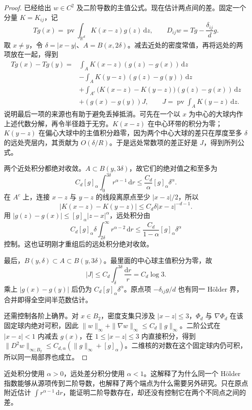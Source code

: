 \begin{proof}
已经给出 \(w\in C^2\) 及二阶导数的主值公式。现在估计两点间的差。固定一个分量 \(K=K_{ij}\)，记
\[
 Tg(x)=\operatorname{pv}\int_{\mathbb R^d}K(x-z)g(z)\,\mathrm dz,
 \qquad D_{ij}w=Tg-\frac{\delta_{ij}}d g.
\]
取 \(x\ne y\)，令 \(\delta=|x-y|\)、\(A=B(x,2\delta)\)。减去近处的密度常值，再将远处的两项放在一起，得到
\begin{align*}
 Tg(x)-Tg(y)={}&
 \int_AK(x-z)(g(z)-g(x))\,\mathrm dz\\
 &-\int_AK(y-z)(g(z)-g(y))\,\mathrm dz\\
 &+\int_{A^c}\bigl(K(x-z)-K(y-z)\bigr)(g(z)-g(x))\,\mathrm dz\\
 &+(g(x)-g(y))J,\qquad
 J=\operatorname{pv}\int_AK(y-z)\,\mathrm dz.
\end{align*}
说明最后一项的来源也有助于避免丢掉抵消。可先在一个以 \(x\) 为中心的大球内作上述代数分解，再令半径趋于无穷。\(K(x-z)\) 在中心环带的积分为零；\(K(y-z)\) 在偏心大球中的主值积分趋零，因为两个中心大球的差只在厚度至多 \(\delta\) 的远处壳层内，其贡献为 \(O(\delta/R)\)。于是远处常数项的差正好是 \(J\)，得到所列公式。

两个近处积分都绝对收敛。\(A\subset B(y,3\delta)\)，故它们的绝对值之和至多为
\[
 C_d[g]_\alpha\int_0^{3\delta}r^{\alpha-1}\,\mathrm dr
 \le\frac{C_d}{\alpha}[g]_\alpha\delta^\alpha.
\]
在 \(A^c\) 上，连接 \(x-z\) 与 \(y-z\) 的线段离原点至少 \(|x-z|/2\)，所以
\[
 |K(x-z)-K(y-z)|\le C_d\delta|x-z|^{-d-1}.
\]
用 \(|g(z)-g(x)|\le[g]_\alpha|z-x|^\alpha\)，远处积分由
\[
 C_d[g]_\alpha\delta\int_{2\delta}^{\infty}r^{\alpha-2}\,\mathrm dr
 \le\frac{C_d}{1-\alpha}[g]_\alpha\delta^\alpha
\]
控制。这也证明刚才重组后的远处积分绝对收敛。

最后，\(B(y,\delta)\subset A\subset B(y,3\delta)\)。最里面的中心球主值积分为零，故
\[
 |J|\le C_d\int_\delta^{3\delta}\frac{\mathrm dr}{r}=C_d\log3.
\]
乘上 \(|g(x)-g(y)|\) 后仍为 \(C_d[g]_\alpha\delta^\alpha\)。原点项 \(-\delta_{ij}g/d\) 也有同一 Hölder 界，合并即得全空间半范数估计。

还需控制各阶上确界。对 \(x\in B_2\)，密度支集只涉及 \(|x-z|\le3\)，\(\Phi_d\) 与 \(\nabla\Phi_d\) 在该固定球内绝对可积，因此 \(\|w\|_\infty+\|\nabla w\|_\infty\le C_d\|g\|_\infty\)。二阶公式在 \(|x-z|<1\) 内减去 \(g(x)\)，在 \(1\le|x-z|\le3\) 内直接积分，得到 \(\|D^2w\|_{\infty;B_2}\le C_{d,\alpha}(\|g\|_\infty+[g]_\alpha)\)。二维核的对数在这个固定球内仍可积，所以同一局部界也成立。
\end{proof}

近处积分使用 \(\alpha>0\)，远处差分积分使用 \(\alpha<1\)。这解释了为什么同一个 Hölder 指数能够从源项传到二阶导数，也解释了两个端点为什么需要另外研究。只在原点附近估计 \(\int r^{\alpha-1}\,\mathrm dr\)，能证明二阶导数存在，却还没有控制它在两个不同点之间的差。

